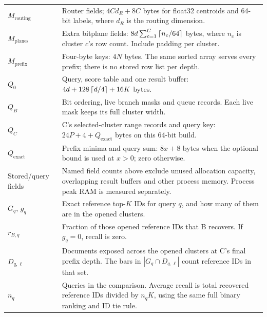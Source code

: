 {\begin{longtable}{@{}p{.22\linewidth}p{.74\linewidth}@{}}
$M_{\mathrm{routing}}$ & Router fields; $4Cd_R+8C$ bytes for float32 centroids and 64-bit labels, where $d_R$ is the routing dimension.\\
$M_{\mathrm{planes}}$ & Extra bitplane fields: $8d\sum_{c=1}^{C}\left\lceil n_c/64\right\rceil$ bytes, where $n_c$ is cluster $c$'s row count. Include padding per cluster.\\
$M_{\mathrm{prefix}}$ & Four-byte keys: $4N$ bytes. The same sorted array serves every prefix; there is no stored row list per depth.\\
$Q_0$ & Query, score table and one result buffer: $4d+128\left\lceil d/4\right\rceil+16K$ bytes.\\
$Q_B$ & Bit ordering, live branch masks and queue records. Each live mask keeps its full cluster width.\\
$Q_C$ & C's selected-cluster range records and query key: $24P+4+Q_{\mathrm{exact}}$ bytes on this 64-bit build.\\
$Q_{\mathrm{exact}}$ & Prefix minima and query sum: $8x+8$ bytes when the optional bound is used at $x>0$; zero otherwise.\\
Stored/query fields & Named field counts above exclude unused allocation capacity, overlapping result buffers and other process memory. Process peak RAM is measured separately.\\
$G_q$, $g_q$ & Exact reference top-$K$ IDs for query $q$, and how many of them are in the opened clusters.\\
$r_{B,q}$ & Fraction of those opened reference IDs that B recovers. If $g_q=0$, recall is zero.\\
$D_{q,\ell}$ & Documents exposed across the opened clusters at C's final prefix depth. The bars in $|G_q\cap D_{q,\ell}|$ count reference IDs in that set.\\
$n_q$ & Queries in the comparison. Average recall is total recovered reference IDs divided by $n_qK$, using the same full binary ranking and ID tie rule.\\
\end{longtable}}

